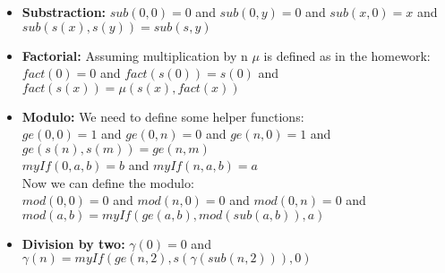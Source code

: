 \documentclass{article}
\begin{document}
\begin{itemize}

  \item{{\bf Substraction:} $sub(0,0)=0$ and $sub(0,y)=0$ and $sub(x,0)=x$ and $sub(s(x),s(y))=sub(s,y)$}
  \item{{\bf Factorial:} Assuming multiplication by n $\mu$ is defined as in the homework: \\
    $fact(0)=0$ and $fact(s(0))=s(0)$ and $fact(s(x))=\mu(s(x),fact(x))$}
  \item{{\bf Modulo: } We need to define some helper functions:\\
    $ge(0,0)=1$ and $ge(0,n)=0$ and $ge(n,0)=1$ and $ge(s(n),s(m))=ge(n,m)$\\
    $myIf(0,a,b)=b$ and $myIf(n,a,b)=a$\\
    Now we can define the modulo:\\
    $mod(0,0)=0$ and $mod(n,0)=0$ and $mod(0,n)=0$ and $mod(a,b)=myIf(ge(a,b),mod(sub(a,b)),a)$\\
    }
  \item{{\bf Division by two:} $\gamma(0)=0$ and $\gamma(n)=myIf(ge(n,2),s(\gamma(sub(n,2))),0)$}

\end{itemize}
    
    
\end{document}
